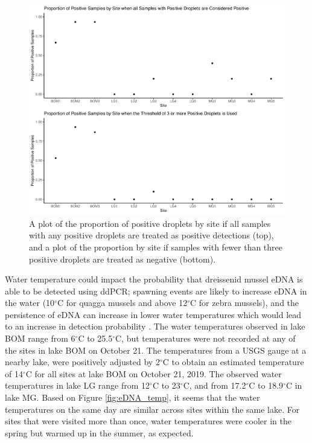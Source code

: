 \documentclass[12pt]{article}\usepackage[]{graphicx}\usepackage[]{color}
\makeatletter
\def\maxwidth{ %
  \ifdim\Gin@nat@width>\linewidth
    \linewidth
  \else
    \Gin@nat@width
  \fi
}
\newenvironment{knitrout}{}{} %
\def\maxwidth{ %
  \ifdim\Gin@nat@width>\linewidth
    \linewidth
  \else
    \Gin@nat@width
  \fi
}
\newenvironment{knitrout}{}{} %
\makeatother
\begin{document}
\begin{figure}[]
\begin{knitrout}
\color{fgcolor}

{\centering \includegraphics[width=\maxwidth]{figure/eDNA_visualization_sample-1} 

}



\end{knitrout}
\caption{A plot of the proportion of positive droplets by site if all samples with any positive droplets are treated as positive detections (top), and a plot of the proportion by site if samples with fewer than three positive droplets are treated as negative (bottom).}
\label{fig:eDNA_sample}
\end{figure}

Water temperature could impact the probability that dreissenid mussel eDNA is able to be detected using ddPCR; spawning events are likely to increase eDNA in the water (10$^\circ$C for quagga mussels and above 12$^\circ$C for zebra mussels), and the persistence of eDNA can increase in lower water temperatures which would lead to an increase in detection probability \cite{Gingera}. The water temperatures observed in lake BOM range from 6$^\circ$C to 25.5$^\circ$C, but temperatures were not recorded at any of the sites in lake BOM on October 21. The temperatures from a USGS gauge at a nearby lake, were positively adjusted by 2$^\circ$C to obtain an estimated temperature of 14$^\circ$C for all sites at lake BOM on October 21, 2019. The observed water temperatures in lake LG range from 12$^\circ$C to 23$^\circ$C, and from 17.2$^\circ$C to 18.9$^\circ$C in lake MG. Based on Figure \ref{fig:eDNA_temp}, it seems that the water temperatures on the same day are similar across sites within the same lake. For sites that were visited more than once, water temperatures were cooler in the spring but warmed up in the summer, as expected. 
\end{document}
